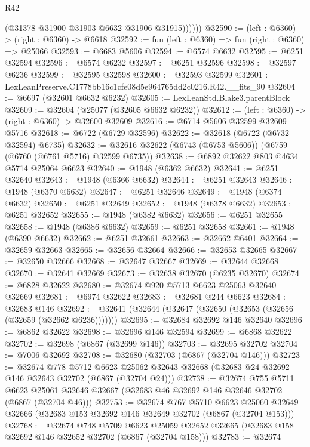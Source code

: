 \begin{lexlean}{R42}
\begin{coremodule}
{              (@31378 @31900 @31903 @6632 @31906 @31915))))))
@32590 := (left : @6360) -> (right : @6360) -> @6618
@32592 := fun (left : @6360) => fun (right : @6360) => @25066
@32593 := @6683 @5606
@32594 := @6574 @6632
@32595 := @6251 @32594
@32596 := @6574 @6232
@32597 := @6251 @32596
@32598 := @32597 @6236
@32599 := @32595 @32598
@32600 := @32593 @32599
@32601 := LexLeanPreserve.C1778bb16c1cfe08d5e964765dd2c0216.R42.__fits_90
@32604 := @6697 (@32601 @6632 @6232)
@32605 := LexLeanStd.Blake3.parentBlock
@32609 := @32604 (@25077 (@32605 @6632 @6232))
@32612 := (left : @6360) -> (right : @6360) -> @32600 @32609
@32616 := @6714 @5606 @32599 @32609 @5716
@32618 := @6722 (@6729 @32596)
@32622 := @32618 (@6722 (@6732 @32594) @6735)
@32632 := @32616 @32622 (@6743 (@6753 @5606)) (@6759 (@6760 (@6761 @5716) @32599 @6735))
@32638 := @6892 @32622 @803 @4634 @5714 @25064 @6623
@32640 := @1948 (@6362 @6632)
@32641 := @6251 @32640
@32643 := @1948 (@6366 @6632)
@32644 := @6251 @32643
@32646 := @1948 (@6370 @6632)
@32647 := @6251 @32646
@32649 := @1948 (@6374 @6632)
@32650 := @6251 @32649
@32652 := @1948 (@6378 @6632)
@32653 := @6251 @32652
@32655 := @1948 (@6382 @6632)
@32656 := @6251 @32655
@32658 := @1948 (@6386 @6632)
@32659 := @6251 @32658
@32661 := @1948 (@6390 @6632)
@32662 := @6251 @32661
@32663 := @32662 @6401
@32664 := @32659 @32663
@32665 := @32656 @32664
@32666 := @32653 @32665
@32667 := @32650 @32666
@32668 := @32647 @32667
@32669 := @32644 @32668
@32670 := @32641 @32669
@32673 := @32638 @32670 (@6235 @32670)
@32674 := @6828 @32622
@32680 := @32674 @920 @5713 @6623 @25063 @32640 @32669
@32681 := @6974 @32622
@32683 := @32681 @244 @6623
@32684 := @32683 @146
@32692 := @32641 (@32644 (@32647 (@32650 (@32653 (@32656 (@32659 (@32662 @6236)))))))
@32695 := @32684 @32692 @146 @32640
@32696 := @6862 @32622
@32698 := @32696 @146 @32594
@32699 := @6868 @32622
@32702 := @32698 (@6867 (@32699 @146))
@32703 := @32695 @32702
@32704 := @7006 @32692
@32708 := @32680 (@32703 (@6867 (@32704 @146)))
@32723 := @32674
    @778
    @5712
    @6623
    @25062
    @32643
    @32668
    (@32683 @24 @32692 @146 @32643 @32702 (@6867 (@32704 @24)))
@32738 := @32674
    @755
    @5711
    @6623
    @25061
    @32646
    @32667
    (@32683 @46 @32692 @146 @32646 @32702 (@6867 (@32704 @46)))
@32753 := @32674
    @767
    @5710
    @6623
    @25060
    @32649
    @32666
    (@32683 @153 @32692 @146 @32649 @32702 (@6867 (@32704 @153)))
@32768 := @32674
    @748
    @5709
    @6623
    @25059
    @32652
    @32665
    (@32683 @158 @32692 @146 @32652 @32702 (@6867 (@32704 @158)))
@32783 := @32674
}
\end{coremodule}
\end{lexlean}
